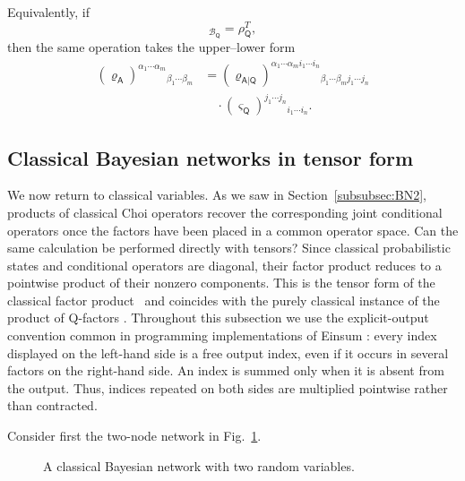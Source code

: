 \documentclass[
    aps,
    pra,
    reprint,
    superscriptaddress,
    nofootinbib
]{revtex4-2}
\theoremstyle{definition}
\theoremstyle{plain}
\begin{document}
Equivalently, if
\begin{equation}
    [\varsigma_{\mathsf{Q}}]_{\mathcal{B}_{\mathsf{Q}}}
    =
    \rho_{\mathsf{Q}}^{T},
\end{equation}
then the same operation takes the upper--lower form
\begin{equation}
    \begin{aligned}
    (\varrho_{\mathsf{A}})
    ^{\alpha_{1}\cdots\alpha_{m}}
    {}_{\beta_{1}\cdots\beta_{m}}
    &=
    (\varrho_{\mathsf{A}|\mathsf{Q}})
    ^{\alpha_{1}\cdots\alpha_{m}i_{1}\cdots i_{n}}
    {}_{\beta_{1}\cdots\beta_{m}j_{1}\cdots j_{n}}\\[-0.25em]
    &\quad\cdot
    (\varsigma_{\mathsf{Q}})
    ^{j_{1}\cdots j_{n}}{}_{i_{1}\cdots i_{n}}.
    \end{aligned}
\end{equation}
\subsection{Classical Bayesian networks in tensor form}
\label{subsec:classical-bn-tensor}

We now return to classical variables. As we saw in
Section~\ref{subsubsec:BN2}, products of classical Choi operators recover
the corresponding joint conditional operators once the factors have
been placed in a common operator space. Can the same calculation be
performed directly with tensors? Since classical probabilistic states
and conditional operators are diagonal, their factor product reduces to a pointwise product of their
nonzero components. This is the tensor form of the classical factor
product~\cite[Sec.~11.3.1]{Darwiche2008} and coincides with the purely
classical instance of the product of Q-factors
\cite[Sec.~3.1 and Def.~17]{DiGuardiaEhrhardFaggian2026}.
Throughout this subsection we use the explicit-output convention common in
programming implementations of Einsum
\cite[Sec.~2.8]{rocktai2018einsum}: every index displayed on the
left-hand side is a free output index, even if it occurs in several
factors on the right-hand side. An index is summed only when it is absent
from the output. Thus, indices repeated on both sides are multiplied
pointwise rather than contracted.

Consider first the two-node network in Fig.~\ref{fig:qbn3}.
\begin{figure}[ht]
    \centering
    \caption{A classical Bayesian network with two random variables.}
    \label{fig:qbn3}
\end{figure}
\end{document}
